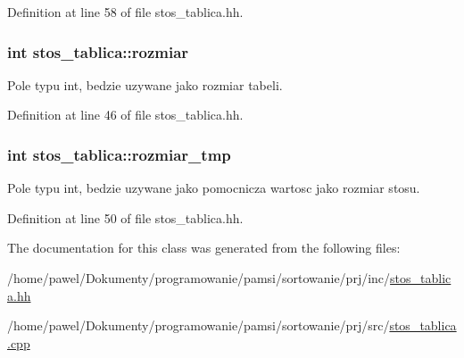 Definition at line 58 of file stos\-\_\-tablica.\-hh.

\hypertarget{classstos__tablica_aa9c1d33bd477174602d2632c74ebea9c}{
\subsubsection[{rozmiar}]{\setlength{\rightskip}{0pt plus 5cm}int stos\-\_\-tablica\-::rozmiar\hspace{0.3cm}{\ttfamily [private]}}}\label{classstos__tablica_aa9c1d33bd477174602d2632c74ebea9c}


Pole typu int, bedzie uzywane jako rozmiar tabeli. 



Definition at line 46 of file stos\-\_\-tablica.\-hh.

\hypertarget{classstos__tablica_adcfe2091d485a93da47eb9fb6a337b06}{
\subsubsection[{rozmiar\-\_\-tmp}]{\setlength{\rightskip}{0pt plus 5cm}int stos\-\_\-tablica\-::rozmiar\-\_\-tmp\hspace{0.3cm}{\ttfamily [private]}}}\label{classstos__tablica_adcfe2091d485a93da47eb9fb6a337b06}


Pole typu int, bedzie uzywane jako pomocnicza wartosc jako rozmiar stosu. 



Definition at line 50 of file stos\-\_\-tablica.\-hh.



The documentation for this class was generated from the following files\-:\begin{DoxyCompactItemize}
\item 
/home/pawel/\-Dokumenty/programowanie/pamsi/sortowanie/prj/inc/\hyperlink{stos__tablica_8hh}{stos\-\_\-tablica.\-hh}\item 
/home/pawel/\-Dokumenty/programowanie/pamsi/sortowanie/prj/src/\hyperlink{stos__tablica_8cpp}{stos\-\_\-tablica.\-cpp}\end{DoxyCompactItemize}
